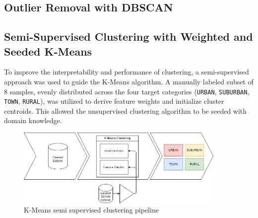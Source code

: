 \documentclass[a4paper,12pt,twoside]{scrreprt}
\begin{document}


\subsection{Outlier Removal with DBSCAN}



\subsection{Semi-Supervised Clustering with Weighted and Seeded K-Means}


To improve the interpretability and performance of clustering, a
semi-supervised approach was used to guide the K-Means algorithm. A manually
labeled subset of 8 samples, evenly distributed across the four target
categories (\texttt{URBAN}, \texttt{SUBURBAN}, \texttt{TOWN}, \texttt{RURAL}),
was utilized to derive feature weights and initialize cluster centroids. This
allowed the unsupervised clustering algorithm to be seeded with domain
knowledge.

\begin{figure}[htbp]
  \centering

  \includegraphics[width=0.9\textwidth]{Diagrams/drawio/implementation/clustering_pipeline.png}
  \caption{K-Means semi supervised clustering pipeline}
  \label{fig:kmeans-clustering-pipline}
\end{figure}
\FloatBarrier
\end{document}
